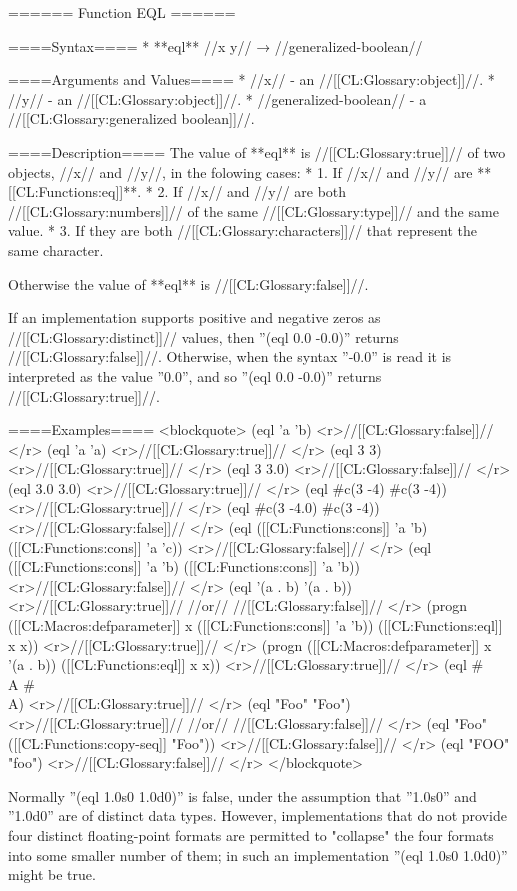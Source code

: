 ====== Function EQL ======

====Syntax====
  * **eql** //x y// → //generalized-boolean//

====Arguments and Values====
  * //x// - an //[[CL:Glossary:object]]//.
  * //y// - an //[[CL:Glossary:object]]//.
  * //generalized-boolean// - a //[[CL:Glossary:generalized boolean]]//.

====Description====
The value of **eql** is //[[CL:Glossary:true]]// of two objects, //x// and //y//, in the folowing cases: 
  * 1. If //x// and //y// are **[[CL:Functions:eq]]**. 
  * 2. If //x// and //y// are both //[[CL:Glossary:numbers]]// of the same //[[CL:Glossary:type]]// and the same value. 
  * 3. If they are both //[[CL:Glossary:characters]]// that represent the same character.

Otherwise the value of **eql** is //[[CL:Glossary:false]]//.

If an implementation supports positive and negative zeros as //[[CL:Glossary:distinct]]// values, then ''(eql 0.0 -0.0)'' returns //[[CL:Glossary:false]]//. Otherwise, when the syntax ''-0.0'' is read it is interpreted as the value ''0.0'', and so ''(eql 0.0 -0.0)'' returns //[[CL:Glossary:true]]//.

====Examples====
<blockquote>
(eql 'a 'b) <r>//[[CL:Glossary:false]]// </r>
(eql 'a 'a) <r>//[[CL:Glossary:true]]// </r>
(eql 3 3) <r>//[[CL:Glossary:true]]// </r>
(eql 3 3.0) <r>//[[CL:Glossary:false]]// </r>
(eql 3.0 3.0) <r>//[[CL:Glossary:true]]// </r>
(eql #c(3 -4) #c(3 -4)) <r>//[[CL:Glossary:true]]// </r>
(eql #c(3 -4.0) #c(3 -4)) <r>//[[CL:Glossary:false]]// </r>
(eql ([[CL:Functions:cons]] 'a 'b) ([[CL:Functions:cons]] 'a 'c)) <r>//[[CL:Glossary:false]]// </r>
(eql ([[CL:Functions:cons]] 'a 'b) ([[CL:Functions:cons]] 'a 'b)) <r>//[[CL:Glossary:false]]// </r>
(eql '(a . b) '(a . b)) <r>//[[CL:Glossary:true]]// 
//or// //[[CL:Glossary:false]]// </r>
(progn ([[CL:Macros:defparameter]] x ([[CL:Functions:cons]] 'a 'b)) ([[CL:Functions:eql]] x x)) <r>//[[CL:Glossary:true]]// </r>
(progn ([[CL:Macros:defparameter]] x '(a . b)) ([[CL:Functions:eql]] x x)) <r>//[[CL:Glossary:true]]// </r>
(eql #\\A #\\A) <r>//[[CL:Glossary:true]]// </r>
(eql "Foo" "Foo") <r>//[[CL:Glossary:true]]// 
//or// //[[CL:Glossary:false]]// </r>
(eql "Foo" ([[CL:Functions:copy-seq]] "Foo")) <r>//[[CL:Glossary:false]]// </r>
(eql "FOO" "foo") <r>//[[CL:Glossary:false]]// </r>
</blockquote>

Normally ''(eql 1.0s0 1.0d0)'' is false, under the assumption that ''1.0s0'' and ''1.0d0'' are of distinct data types. However, implementations that do not provide four distinct floating-point formats are permitted to "collapse" the four formats into some smaller number of them; in such an implementation ''(eql 1.0s0 1.0d0)'' might be true.


